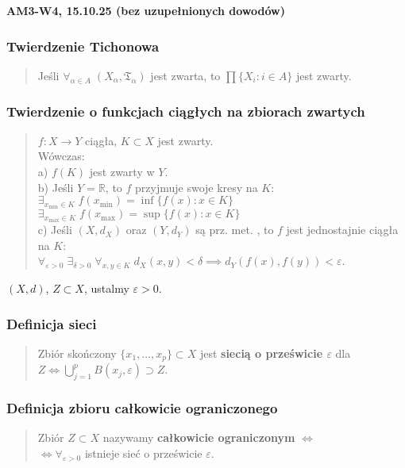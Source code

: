 \documentclass[10pt,a4paper]{article}
\newcommand{\zagadnienie}[3]{%
    \clearpage %
    \noindent\textbf{#1} #2\\
    #3
}
\begin{document}
\zagadnienie{AM3-W4, 15.10.25 (bez uzupełnionych dowodów)}{}
{
    \subsubsection*{Twierdzenie Tichonowa}
    \begin{quote}
    Jeśli $\forall_{\alpha \in A} \; (X_\alpha, \mathfrak{T}_\alpha)$ jest zwarta, to $\prod \{X_i : i \in A\}$ jest zwarty.
    \end{quote}

    \subsubsection*{Twierdzenie o funkcjach ciągłych na zbiorach zwartych}
    \begin{quote}
    $f: X \to Y$ ciągła, $K \subset X$ jest zwarty. \\
    Wówczas: \\
    a) $f(K)$ jest zwarty w $Y$. \\
    b) Jeśli $Y = \mathbb{R}$, to $f$ przyjmuje swoje kresy na $K$: \\
    $\exists_{x_{\mathrm{min}} \in K} \; f(x_{\mathrm{min}}) = \inf \{f(x) : x \in K\}$ \\
    $\exists_{x_{\mathrm{max}} \in K} \; f(x_{\mathrm{max}}) = \sup \{f(x) : x \in K\}$ \\
    c) Jeśli $(X, d_X)$ oraz $(Y, d_Y)$ są prz. met. , to $f$ jest jednostajnie ciągła na $K$: \\
    $\forall_{\varepsilon > 0} \; \exists_{\delta > 0} \; \forall_{x, y \in K} \; d_X(x, y) < \delta \implies d_Y(f(x), f(y)) < \varepsilon$.
    \end{quote}

    $(X, d)$, $Z \subset X$, ustalmy $\varepsilon > 0$. \\
    \subsubsection*{Definicja sieci}
    \begin{quote}
    Zbiór skończony $\{x_1, \dots, x_p\} \subset X$ jest \textbf{siecią o prześwicie $\varepsilon$} dla \\
    $Z \iff \bigcup_{j=1}^p B(x_j, \varepsilon) \supset Z$.
    \end{quote}

    \subsubsection*{Definicja zbioru całkowicie ograniczonego}
    \begin{quote}
    Zbiór $Z \subset X$ nazywamy \textbf{całkowicie ograniczonym} $\iff$ \\
    $\iff \forall_{\varepsilon > 0}$ istnieje sieć o prześwicie $\varepsilon$.
    \end{quote}

}
\end{document}
